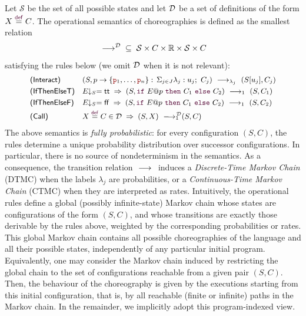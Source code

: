 Let $\mathcal S$ be the set of all possible states and let $\mathcal D$ be
a set of definitions of the form
$X \stackrel{\textcolor{sh_keyword}{\mathsf{def}}}{=} C$. The
operational semantics of choreographies is defined as the smallest
relation
\[
  \ \longrightarrow_{}\ \!\!\!\!^{\mathcal D} \;\subseteq\; \mathcal S \times C \times
  \mathbb R \times \mathcal S \times C
\]
satisfying the rules below (we omit $\mathcal D$ when it is not relevant):
\begin{displaymath}\small
  \begin{array}{l@{\quad}llll}
    \textsf{(Interact)} &
                          (S, \interact{p}{\role p_1,\ldots,\role p_n})
                          \red{\lambda_j}
                          (S[u_j], C_j)
    \\[1mm]
    \textsf{(IfThenElseT)} &
                             \eval E S = \mathsf{tt} \;\Rightarrow\;
                             (S,\ifTE{E}{p}{C_1}{C_2})
                             \red{1}
                             (S, C_1)
    \\[1mm]
    \textsf{(IfThenElseF)} &
                             \eval E S = \mathsf{ff} \;\Rightarrow\;
                             (S,\ifTE{E}{p}{C_1}{C_2})
                             \red{1}
                             (S, C_2)
    \\[1mm]
    \textsf{(Call)} &
                      X \stackrel{\textcolor{sh_keyword}{\mathsf{def}}}{=} C \in \defin
                      \;\Rightarrow\;
                      (S, X) \red{{1}}^{\!\!\!\!\!\!\!\defin} (S, C)
  \end{array}
\end{displaymath}
The above semantics is \emph{fully probabilistic}: for every
configuration $(S,C)$, the rules determine a unique probability
distribution over successor configurations. In particular, there is
no source of nondeterminism in the semantics. As a consequence, the
transition relation $\ \longrightarrow_{}\ $ induces a \emph{Discrete-Time Markov
Chain} (DTMC) when the labels $\lambda_j$ are probabilities, or a
\emph{Continuous-Time Markov Chain} (CTMC) when they are interpreted
as rates.
Intuitively, the operational rules define a global (possibly
infinite-state) Markov chain whose states are configurations of the
form $(S,C)$, and whose transitions are exactly those derivable by the
rules above, weighted by the corresponding probabilities or rates.
This global Markov chain contains all possible choreographies of the
language and all their possible states, independently of any
particular initial program.
Equivalently, one may consider the Markov chain induced by restricting
the global chain to the set of configurations reachable from a given
pair $(S,C)$. Then, the behaviour of the choreography is given by the
executions starting from this initial configuration, that is, by all
reachable (finite or infinite) paths in the Markov chain. In the
remainder, we implicitly adopt this program-indexed view.


